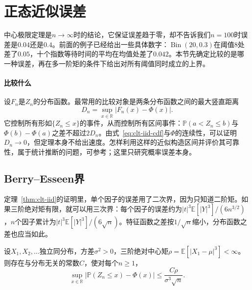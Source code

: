 \section{正态近似误差}
\label{sec:clt-error}

中心极限定理是$n\to\infty$时的结论，它保证误差趋于零，却不告诉我们$n=100$时误差是$0.04$还是$0.4$。前面的例子已经给出一些具体数字：$\operatorname{Bin}(20,0.3)$在阈值$8$处差了$0.05$，十个指数等待时间的平均在均值处差了$0.042$。本节先确定比较的是哪一种误差，再在多一阶矩的条件下给出对所有阈值同时成立的上界。

\paragraph{比较什么}
设$F_n$是$Z_n$的分布函数。最常用的比较对象是两条分布函数之间的最大竖直距离
\begin{equation}
 D_n=\sup_{x\in\mathbb{R}}\bigl\lvert F_n(x)-\Phi(x)\bigr\rvert .
 \label{eq:clt-kolmogorov}
\end{equation}
它控制所有形如$\{Z_n\leq x\}$的事件，从而控制所有区间事件：$\mathbb{P}(a<Z_n\leq b)$与$\Phi(b)-\Phi(a)$之差不超过$2D_n$。由式~\eqref{eq:clt-iid-cdf}与$\Phi$的连续性，可以证明$D_n\to0$，但定理本身不给出速度。怎样利用这样的近似构造区间并评价其可靠性，属于统计推断的问题，可参考；这里只研究概率误差本身。

\subsection{Berry--Esseen界}
\label{sec:clt-berry-esseen}

定理~\ref{thm:clt-iid}的证明里，单个因子的误差用了二次界，因为只知道二阶矩。如果三阶绝对矩有限，就可以用三次界：每个因子的误差约为$\lvert t\rvert^3\mathbb{E}[\lvert Y\rvert^3]/(6n^{3/2})$，$n$个因子累计为$\lvert t\rvert^3\mathbb{E}[\lvert Y\rvert^3]/(6\sqrt{n})$。特征函数之差按$1/\sqrt{n}$缩小，分布函数之差也应当如此。

\begin{theorem}
\label{thm:clt-berry-esseen}
设$X_1,X_2,\dots$独立同分布，方差$\sigma^2>0$，三阶绝对中心矩$\rho=\mathbb{E}[\lvert X_1-\mu\rvert^{3}]<\infty$。则存在与分布无关的常数$C$，使对每个$n\geq1$，
\begin{equation}
 \sup_{x\in\mathbb{R}}\bigl\lvert\mathbb{P}(Z_n\leq x)-\Phi(x)\bigr\rvert\leq\frac{C\rho}{\sigma^{3}\sqrt{n}} .
 \label{eq:clt-berry-esseen}
\end{equation}
\end{theorem}

